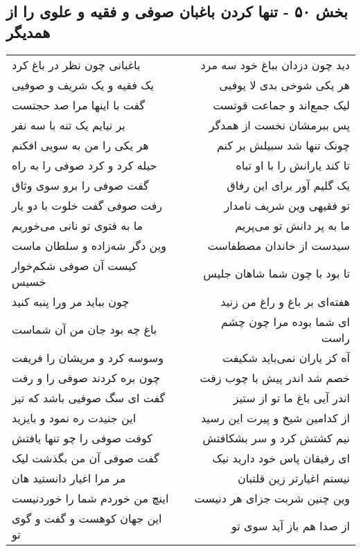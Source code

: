 \begin{center}
\section*{بخش ۵۰ - تنها کردن باغبان صوفی و فقیه و علوی را از همدیگر}
\label{sec:sh050}
\begin{longtable}{l p{0.5cm} r}
باغبانی چون نظر در باغ کرد
&&
دید چون دزدان بباغ خود سه مرد
\\
یک فقیه و یک شریف و صوفیی
&&
هر یکی شوخی بدی لا یوفیی
\\
گفت با اینها مرا صد حجتست
&&
لیک جمع‌اند و جماعت قوتست
\\
بر نیایم یک تنه با سه نفر
&&
پس ببرمشان نخست از همدگر
\\
هر یکی را من به سویی افکنم
&&
چونک تنها شد سبیلش بر کنم
\\
حیله کرد و کرد صوفی را به راه
&&
تا کند یارانش را با او تباه
\\
گفت صوفی را برو سوی وثاق
&&
یک گلیم آور برای این رفاق
\\
رفت صوفی گفت خلوت با دو یار
&&
تو فقیهی وین شریف نامدار
\\
ما به فتوی تو نانی می‌خوریم
&&
ما به پر دانش تو می‌پریم
\\
وین دگر شه‌زاده و سلطان ماست
&&
سیدست از خاندان مصطفاست
\\
کیست آن صوفی شکم‌خوار خسیس
&&
تا بود با چون شما شاهان جلیس
\\
چون بباید مر ورا پنبه کنید
&&
هفته‌ای بر باغ و راغ من زنید
\\
باغ چه بود جان من آن شماست
&&
ای شما بوده مرا چون چشم راست
\\
وسوسه کرد و مریشان را فریفت
&&
آه کز یاران نمی‌باید شکیفت
\\
چون بره کردند صوفی را و رفت
&&
خصم شد اندر پیش با چوب زفت
\\
گفت ای سگ صوفیی باشد که تیز
&&
اندر آیی باغ ما تو از ستیز
\\
این جنیدت ره نمود و بایزید
&&
از کدامین شیخ و پیرت این رسید
\\
کوفت صوفی را چو تنها یافتش
&&
نیم کشتش کرد و سر بشکافتش
\\
گفت صوفی آن من بگذشت لیک
&&
ای رفیقان پاس خود دارید نیک
\\
مر مرا اغیار دانستید هان
&&
نیستم اغیارتر زین قلتبان
\\
اینچ من خوردم شما را خوردنیست
&&
وین چنین شربت جزای هر دنیست
\\
این جهان کوهست و گفت و گوی تو
&&
از صدا هم باز آید سوی تو
\\

\end{longtable}
\end{center}
